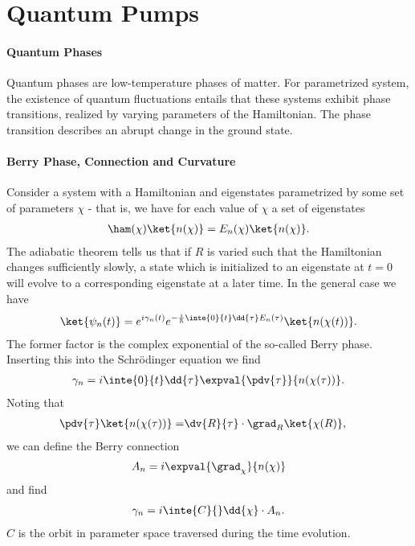 \section{Quantum Pumps}

\paragraph{Quantum Phases}
Quantum phases are low-temperature phases of matter. For parametrized system, the existence of quantum fluctuations entails that these systems exhibit phase transitions, realized by varying parameters of the Hamiltonian. The phase transition describes an abrupt change in the ground state.

\paragraph{Berry Phase, Connection and Curvature}
Consider a system with a Hamiltonian and eigenstates parametrized by some set of parameters $\chi$ - that is, we have for each value of $\chi$ a set of eigenstates
\begin{align*}
	\ham(\chi)\ket{n(\chi)} = E_{n}(\chi)\ket{n(\chi)}.
\end{align*}
The adiabatic theorem tells us that if $R$ is varied such that the Hamiltonian changes sufficiently slowly, a state which is initialized to an eigenstate at $t = 0$ will evolve to a corresponding eigenstate at a later time. In the general case we have
\begin{align*}
	\ket{\psi_{n}(t)} = e^{i\gamma_{n}(t)}e^{-\frac{i}{\hbar}\inte{0}{t}\dd{\tau} E_{n}(\tau)}\ket{n(\chi(t))}.
\end{align*}
The former factor is the complex exponential of the so-called Berry phase. Inserting this into the Schrödinger equation we find
\begin{align*}
	\gamma_{n} = i\inte{0}{t}\dd{\tau}\expval{\pdv{\tau}}{n(\chi(\tau))}.
\end{align*}
Noting that
\begin{align*}
	\pdv{\tau}\ket{n(\chi(\tau))} =& \dv{R}{\tau}\cdot\grad_{R}\ket{\chi(R)},
\end{align*}
we can define the Berry connection
\begin{align*}
	A_{n} = i\expval{\grad_{\chi}}{n(\chi)}
\end{align*}
and find
\begin{align*}
	\gamma_{n} = i\inte{C}{}\dd{\chi}\cdot A_{n}.
\end{align*}
$C$ is the orbit in parameter space traversed during the time evolution.

